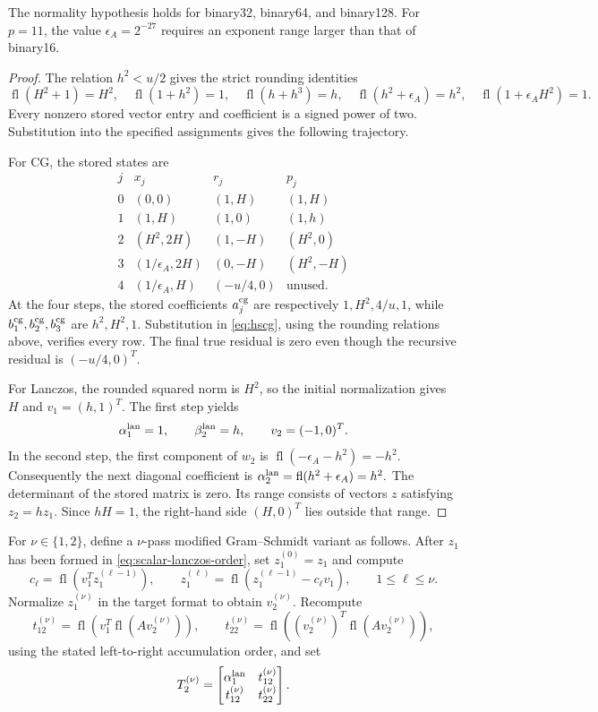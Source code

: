 \documentclass[11pt]{article}
\theoremstyle{definition}
\newcommand{\fl}{\operatorname{fl}}
\begin{document}
The normality hypothesis holds for binary32, binary64, and binary128.
For $p=11$, the value $\epsilon_A=2^{-27}$ requires an exponent range
larger than that of binary16.

\begin{proof}
The relation $h^2<u/2$ gives the strict rounding identities
\[
 \fl(H^2+1)=H^2,
 \quad \fl(1+h^2)=1,
 \quad \fl(h+h^3)=h,
 \quad \fl(h^2+\epsilon_A)=h^2,
 \quad \fl(1+\epsilon_AH^2)=1.
\]
Every nonzero stored vector entry and coefficient is a signed power of
two.  Substitution into the specified assignments gives the following
trajectory.

For CG, the stored states are
\[
\begin{array}{c|c|c|c}
j&x_j&r_j&p_j\\ \hline
0&(0,0)&(1,H)&(1,H)\\
1&(1,H)&(1,0)&(1,h)\\
2&(H^2,2H)&(1,-H)&(H^2,0)\\
3&(1/\epsilon_A,2H)&(0,-H)&(H^2,-H)\\
4&(1/\epsilon_A,H)&(-u/4,0)&\text{unused}.
\end{array}
\]
At the four steps, the stored coefficients $a_j^{\rm cg}$ are respectively
$1,H^2,4/u,1$, while
$b_1^{\rm cg},b_2^{\rm cg},b_3^{\rm cg}$ are $h^2,H^2,1$.
Substitution in \eqref{eq:hscg}, using the rounding relations above,
verifies every row.  The final true residual is zero even though the recursive
residual is $(-u/4,0)^T$.

For Lanczos, the rounded squared norm is $H^2$, so the initial
normalization gives $H$ and $v_1=(h,1)^T$.  The first step yields
\[
 \alpha_1^{\rm lan}=1,
 \qquad \beta_2^{\rm lan}=h,
 \qquad v_2=(-1,0)^T.
\]
In the second step, the first component of $w_2$ is
$\fl(-\epsilon_A-h^2)=-h^2$.  Consequently the next diagonal coefficient is
\(
 \alpha_2^{\rm lan}=\fl(h^2+\epsilon_A)=h^2.
\)
The determinant of the stored matrix is zero.  Its range consists of
vectors $z$ satisfying $z_2=hz_1$.  Since $hH=1$, the right-hand side
$(H,0)^T$ lies outside that range.
\end{proof}

For $\nu\in\{1,2\}$, define a $\nu$-pass modified Gram--Schmidt variant as
follows.  After $z_1$ has been formed in
\eqref{eq:scalar-lanczos-order}, set $z_1^{(0)}=z_1$ and compute
\[
 c_\ell=\fl\!\left(v_1^Tz_1^{(\ell-1)}\right),
 \qquad
 z_1^{(\ell)}=
 \fl\!\left(z_1^{(\ell-1)}-c_\ell v_1\right),
 \qquad 1\le\ell\le\nu.
\]
Normalize $z_1^{(\nu)}$ in the target format to obtain $v_2^{(\nu)}$.
Recompute
\[
 t_{12}^{(\nu)}=\fl\!\left(v_1^T\fl(Av_2^{(\nu)})\right),
 \qquad
 t_{22}^{(\nu)}=\fl\!\left((v_2^{(\nu)})^T
                      \fl(Av_2^{(\nu)})\right),
\]
using the stated left-to-right accumulation order, and set
\[
 T_2^{(\nu)}=
 \begin{bmatrix}
  \alpha_1^{\rm lan}&t_{12}^{(\nu)}\\
  t_{12}^{(\nu)}&t_{22}^{(\nu)}
 \end{bmatrix}.
\]
\end{document}
